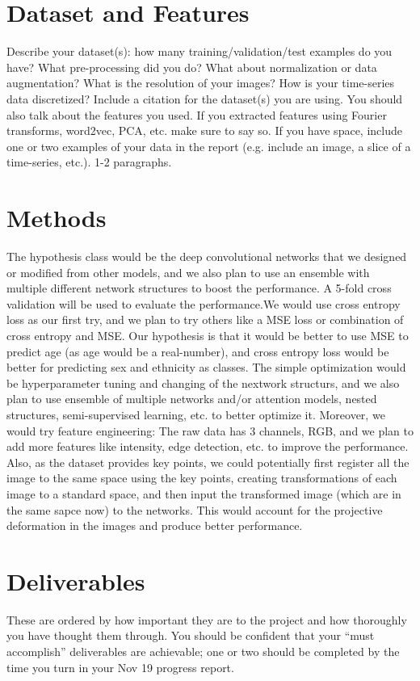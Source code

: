 \documentclass{article}
\begin{document}
\section{Dataset and Features}
Describe your dataset(s): how many training/validation/test examples do you have? What pre-processing did you do? What about normalization or data augmentation? What is the
resolution of your images? How is your time-series data discretized? Include a citation for the dataset(s) you are using.
You should also talk about the features you used. If you extracted
features using Fourier transforms, word2vec, PCA, etc. make sure to say so. If you have space, include one or two examples of your data in the report
(e.g. include an image, a slice of a time-series, etc.). 1-2 paragraphs.

\section{Methods}
The hypothesis class would be the deep convolutional networks that we designed or modified from other models, and we also plan to use an ensemble with multiple different network structures to boost the performance. A 5-fold cross validation will be used to evaluate the performance.We would use cross entropy loss as our first try, and we plan to try others like a MSE loss or combination of cross entropy and MSE. Our hypothesis is that it would be better to use MSE to predict age (as age would be a real-number), and cross entropy loss would be better for predicting sex and ethnicity as classes. The simple optimization would be hyperparameter tuning and changing of the nextwork structurs, and we also plan to use ensemble of multiple networks and/or attention models, nested structures, semi-supervised learning, etc. to better optimize it. Moreover, we would try feature engineering: The raw data has 3 channels, RGB, and we plan to add more features like intensity, edge detection, etc. to improve the performance. Also, as the dataset provides key points, we could potentially first register all the image to the same space using the key points, creating transformations of each image to a standard space, and then input the transformed image (which are in the same sapce now) to the networks. This would account for the projective deformation in the images and produce better performance. 

\section{Deliverables}
These are ordered by how important they are to the project and how thoroughly you have thought them through. You should be confident that your ``must accomplish'' deliverables are achievable; one or two should be completed by the time you turn in your Nov 19 progress report.
\end{document}
